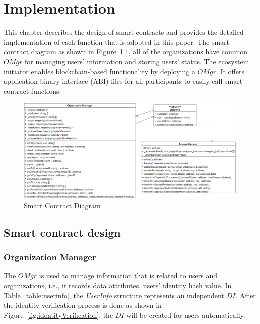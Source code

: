 \chapter{Implementation} 
\label{chapter:implementation}
This chapter describes the design of smart contracts and provides the detailed implementation of each function that is adopted in this paper. The smart contract diagram as shown in Figure~\ref{fig:smart_contract_diagram},  all of the organizations have common \(OMgr\) for managing users' information and storing users' status. The ecosystem initiator enables blockchain-based functionality by deploying a \(OMgr\). It offers application binary interface (ABI) files for all participants to easily call smart contract functions.

\begin{figure}[hb]
    \centering
    \includegraphics[height=!,width=1\linewidth,keepaspectratio=true]{figures/smart_contract_diagram.png}
    \caption{{\footnotesize Smart Contract Diagram}}
    \label{fig:smart_contract_diagram}
\end{figure}
\section{Smart contract design}
\subsection*{Organization Manager}
The \(OMgr\) is used to manage information that is related to users and organizations, i.e., it records data attributes, users' identity hash value. In Table~\ref{table:userinfo}, the \textit{UserInfo} structure represents an independent \(DI\). After the identity verification process is done as shown in Figure~\ref{fig:identityVerification}, the \(DI\) will be created for users automatically.



